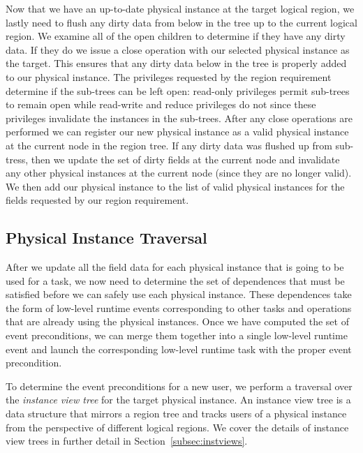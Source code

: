 Now that we have an up-to-date physical instance
at the target logical region, we lastly
need to flush any dirty data from below in 
the tree up to the current logical region.
We examine all of the open children to 
determine if they have any dirty data. If
they do we issue a close operation with 
our selected physical instance as the target.
This ensures that any dirty data below in
the tree is properly added to our physical
instance. The privileges requested by 
the region requirement determine if the
sub-trees can be left open: read-only privileges
permit sub-trees to remain open while read-write
and reduce privileges do not since these privileges
invalidate the instances in the
sub-trees. After any close operations
are performed we can register our new
physical instance as a valid physical
instance at the current node in the 
region tree.  If any dirty data was flushed
up from sub-tress, then we update the
set of dirty fields at the current node
and invalidate any other physical instances
at the current node (since they are no
longer valid).  We then add our physical
instance to the list of valid physical
instances for the fields requested by
our region requirement.

\subsection{Physical Instance Traversal}
\label{subsec:instancetraversal}
After we update all the field data for
each physical instance that is going to be
used for a task, we now need to
determine the set of dependences that 
must be satisfied before we can safely
use each physical instance. These dependences take
the form of low-level runtime events 
corresponding to other tasks and operations
that are already using the physical
instances. Once we have computed the set
of event preconditions, we can merge
them together into a single low-level
runtime event and launch the corresponding
low-level runtime task with the proper
event precondition.

To determine the event preconditions for
a new user, we perform a traversal over
the {\em instance view tree} for the target
physical instance. An instance view tree is a
data structure that mirrors a region tree and
tracks users of a physical instance from the
perspective of different logical regions. We
cover the details of instance view trees in
further detail in Section~\ref{subsec:instviews}.

